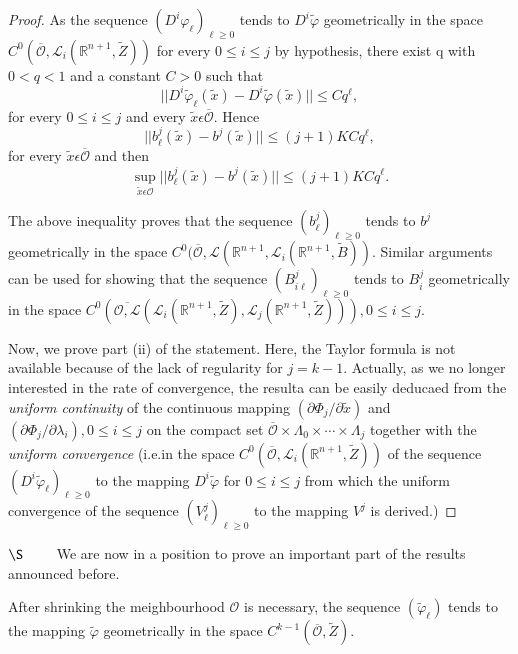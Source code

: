 \begin{proof}
As the sequence $(D^{i} \varphi_{\ell})_{\ell \geq 0}$ tends to
$D^{i}\widetilde{\varphi}$ geometrically in the space
$C^{0}(\overline{\mathscr{O}}, \mathscr{L}_{i} (\mathbb{R}^{n+1},
\widetilde{Z}))$ for every $0 \leq i \leq j$ by hypothesis, there
exist q with $0 < q < 1$ and a constant $C > 0$  such that
$$
||D^{i}\widetilde{\varphi}_{\ell} (\widetilde{x}) -
D^{i}\widetilde{\varphi}(\widetilde{x})|| \leq Cq^{\ell},
$$
for every $0 \leq i \leq j$ and every $\widetilde{x} \epsilon
\overline{\mathscr{O}}$. Hence
$$
||b_{\ell}^{j}(\widetilde{x}) - b^{j}(\widetilde{x})|| \leq (j+1)KCq^{\ell},
$$
for every $\widetilde{x} \epsilon \overline{\mathscr{O}}$ and then
$$
\sup_{\widetilde{x} \epsilon \mathscr{O}}
||b_{\ell}^{j}(\widetilde{x}) - b^{j}(\widetilde{x})|| \leq (j+1) KCq^{\ell}.
$$

The above inequality proves that the sequence $(b_{\ell}^{j})_{\ell
  \geq 0}$ tends to $b^{j}$ geometrically in the space
$C^{0}(\overline{\mathscr{O}}, \mathscr{L}(\mathbb{R}^{n+1},
\mathscr{L}_{i}(\mathbb{R}^{n+1}, \widetilde{B}))$. Similar arguments
can be used for showing that the sequence $(B_{i \ell}^{j})_{\ell \geq
0}$ tends to $B_{i}^{j}$ geometrically in the space
$C^{0}(\overline{\mathscr{O},
  \mathscr{L}}(\mathscr{L}_{i}(\mathbb{R}^{n+1}, \widetilde{Z}),
\mathscr{L}_{j}(\mathbb{R}^{n+1}, \widetilde{Z}))), 0 \leq i \leq j$.

Now, we prove part (ii) of the statement. Here, the Taylor formula is
not available because of the lack of regularity for $j =
k-1$. Actually, as we no longer interested in the rate of convergence,
the resulta can be easily deducaed from the {\em uniform continuity}
of the continuous mapping $(\partial \Phi_{j} / \partial
\widetilde{x})$ and $(\partial \Phi_{j} / \partial \lambda_{i}), 0
\leq i \leq j$ on the compact set $\overline{\mathscr{O}} \times
\Lambda_{0} \times \cdots \times \Lambda_{j}$ together with the {\em
  uniform convergence} (i.e.\pageoriginale in the space
$C^{0}(\overline{\mathscr{O}}, \mathscr{L}_{i}(\mathbb{R}^{n+1},
\widetilde{Z}))$ of the sequence
$(D^{i}\widetilde{\varphi}_{\ell})_{\ell \geq 0}$ to the mapping
$D^{i}\widetilde{\varphi}$ for $0 \leq i \leq j$ from which the
uniform convergence of the sequence $(V_{\ell}^{j})_{\ell \geq 0}$ to
the mapping $V^{j}$ is derived.)
\end{proof}

$\S \qquad$ We are now in a position to prove an important part of the
results announced before. 
 
\begin{alphtheorem}\label{app-2-thmA2.2}%
After shrinking the meighbourhood $\mathscr{O}$ is necessary, the
sequence $(\widetilde{\varphi}_{\ell})$ tends to the mapping
$\widetilde{\varphi}$ geometrically in the space
$C^{k-1}(\overline{\mathscr{O}}, \widetilde{Z})$.
\end{alphtheorem}

